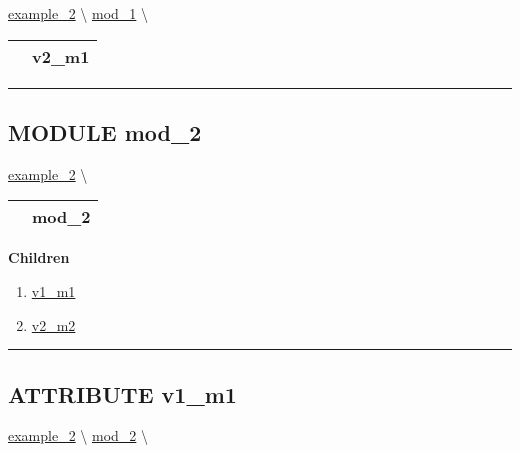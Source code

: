 \hypertarget{ecldoc:example_2.mod_1.v2_m1}{}
\hspace{0pt} \hyperlink{ecldoc:example_2}{example_2} \textbackslash 
\hspace{0pt} \hyperlink{ecldoc:example_2.mod_1}{mod_1} \textbackslash 

{\renewcommand{\arraystretch}{1.5}
\begin{tabularx}{\textwidth}{|>{\raggedright\arraybackslash}l|X|}
\hline
\hspace{0pt}\mytexttt{\color{red} } & \textbf{v2\_m1} \\
\hline
\end{tabularx}
}

\par


\rule{\linewidth}{0.5pt}


\subsection*{\textsf{\colorbox{headtoc}{\color{white} MODULE}
mod\_2}}

\hypertarget{ecldoc:example_2.mod_2}{}
\hspace{0pt} \hyperlink{ecldoc:example_2}{example_2} \textbackslash 

{\renewcommand{\arraystretch}{1.5}
\begin{tabularx}{\textwidth}{|>{\raggedright\arraybackslash}l|X|}
\hline
\hspace{0pt}\mytexttt{\color{red} } & \textbf{mod\_2} \\
\hline
\end{tabularx}
}

\par


\textbf{Children}
\begin{enumerate}
\item \hyperlink{ecldoc:example_2.mod_2.v1_m1}{v1\_m1}
\item \hyperlink{ecldoc:example_2.mod_2.v2_m2}{v2\_m2}
\end{enumerate}

\rule{\linewidth}{0.5pt}

\subsection*{\textsf{\colorbox{headtoc}{\color{white} ATTRIBUTE}
v1\_m1}}

\hypertarget{ecldoc:example_2.mod_2.v1_m1}{}
\hspace{0pt} \hyperlink{ecldoc:example_2}{example_2} \textbackslash 
\hspace{0pt} \hyperlink{ecldoc:example_2.mod_2}{mod_2} \textbackslash 

